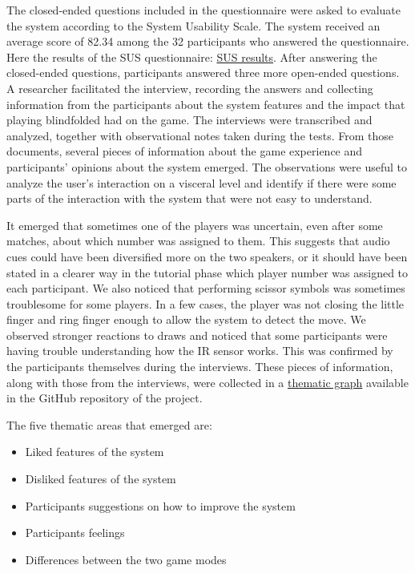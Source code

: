 \documentclass[11pt,a4paper]{report}
\begin{document}
\noindent The closed-ended questions included in the questionnaire were asked to evaluate the system according to the System Usability Scale. The system received an average score of 82.34 among the 32 participants who answered the questionnaire. Here the results of the SUS questionnaire: \href{https://github.com/icaro-rdp/enhaced-rock-paper-scissors/blob/main/Research/Quantitative/SUS/sus_results_breakdown.png}{SUS results}.
After answering the closed-ended questions, participants answered three more open-ended questions. A researcher facilitated the interview, recording the answers and collecting information from the participants about the system features and the impact that playing blindfolded had on the game. The interviews were transcribed and analyzed, together with observational notes taken during the tests. From those documents, several pieces of information about the game experience and participants' opinions about the system emerged. The observations were useful to analyze the user's interaction on a visceral level and identify if there were some parts of the interaction with the system that were not easy to understand.

\noindent It emerged that sometimes one of the players was uncertain, even after some matches, about which number was assigned to them. This suggests that audio cues could have been diversified more on the two speakers, or it should have been stated in a clearer way in the tutorial phase which player number was assigned to each participant. We also noticed that performing scissor symbols was sometimes troublesome for some players. In a few cases, the player was not closing the little finger and ring finger enough to allow the system to detect the move. We observed stronger reactions to draws and noticed that some participants were having trouble understanding how the IR sensor works. This was confirmed by the participants themselves during the interviews. These pieces of information, along with those from the interviews, were collected in a \href{https://github.com/icaro-rdp/enhaced-rock-paper-scissors/blob/main/Research/Qualitative/InterviewsAnalysis.png}{thematic graph} available in the GitHub repository of the project. 

\noindent The five thematic areas that emerged are: 
\begin{itemize}
  \item Liked features of the system
  \item Disliked features of the system
  \item Participants suggestions on how to improve the system
  \item Participants feelings
  \item Differences between the two game modes
\end{itemize}
\end{document}
